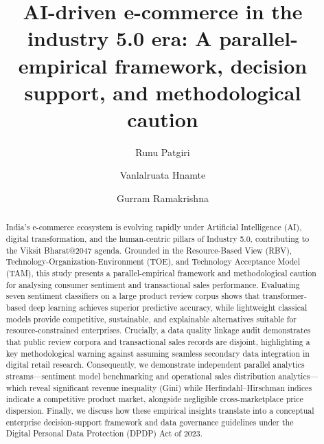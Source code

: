 \documentclass[authoryear,review,3p,times,12pt]{elsarticle}
\begin{document}
\begin{frontmatter}

\title{{AI}-driven e-commerce in the industry 5.0 era: A parallel-empirical framework, decision support, and methodological caution}

\author[inst1]{Runu Patgiri} %

\author[inst2,inst3]{Vanlalruata Hnamte}

\author[inst1]{Gurram Ramakrishna}





\begin{abstract}
India's e-commerce ecosystem is evolving rapidly under Artificial Intelligence (AI), digital transformation, and the human-centric pillars of Industry 5.0, contributing to the Viksit Bharat@2047 agenda. Grounded in the Resource-Based View (RBV), Technology-Organization-Environment (TOE), and Technology Acceptance Model (TAM), this study presents a parallel-empirical framework and methodological caution for analysing consumer sentiment and transactional sales performance. Evaluating seven sentiment classifiers on a large product review corpus shows that transformer-based deep learning achieves superior predictive accuracy, while lightweight classical models provide competitive, sustainable, and explainable alternatives suitable for resource-constrained enterprises. Crucially, a data quality linkage audit demonstrates that public review corpora and transactional sales records are disjoint, highlighting a key methodological warning against assuming seamless secondary data integration in digital retail research. Consequently, we demonstrate independent parallel analytics streams—sentiment model benchmarking and operational sales distribution analytics—which reveal significant revenue inequality (Gini) while Herfindahl–Hirschman indices indicate a competitive product market, alongside negligible cross-marketplace price dispersion. Finally, we discuss how these empirical insights translate into a conceptual enterprise decision-support framework and data governance guidelines under the Digital Personal Data Protection (DPDP) Act of 2023.
\end{abstract}


\end{frontmatter}
\end{document}
